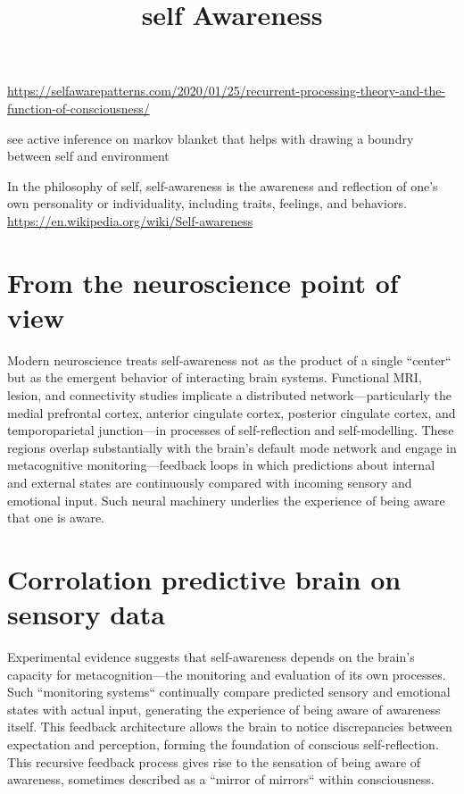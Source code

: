 \documentclass[a4paper]{article}
\title{self Awareness}
\date{}
\begin{document}
    \maketitle
    \url{https://selfawarepatterns.com/2020/01/25/recurrent-processing-theory-and-the-function-of-consciousness/}
    
    see active inference on markov blanket that helps with drawing a boundry between self and environment
    
    In the philosophy of self, self-awareness is the awareness and reflection of one's own personality or individuality, including traits, feelings, and behaviors. \url{https://en.wikipedia.org/wiki/Self-awareness}
    
    \section{From the neuroscience point of view}
    Modern neuroscience treats self-awareness not as the product of a single ``center`` but as the emergent behavior of interacting brain systems. Functional MRI, lesion, and connectivity studies implicate a distributed network—particularly the medial prefrontal cortex, anterior cingulate cortex, posterior cingulate cortex, and temporoparietal junction—in processes of self-reflection and self-modelling. These regions overlap substantially with the brain's default mode network and engage in metacognitive monitoring—feedback loops in which predictions about internal and external states are continuously compared with incoming sensory and emotional input. Such neural machinery underlies the experience of being aware that one is aware.\cite{fleming-frith-2014-metacognition}
    
    \section{Corrolation predictive brain on sensory data}
    Experimental evidence suggests that self-awareness depends on the brain's capacity for metacognition—the monitoring and evaluation of its own processes. Such ``monitoring systems`` continually compare predicted sensory and emotional states with actual input, generating the experience of being aware of awareness itself. This feedback architecture allows the brain to notice discrepancies between expectation and perception, forming the foundation of conscious self-reflection. This recursive feedback process gives rise to the sensation of being aware of awareness, sometimes described as a ``mirror of mirrors`` within consciousness.\cite{garcia-2013-stuck-in-the-moment}
\end{document}
